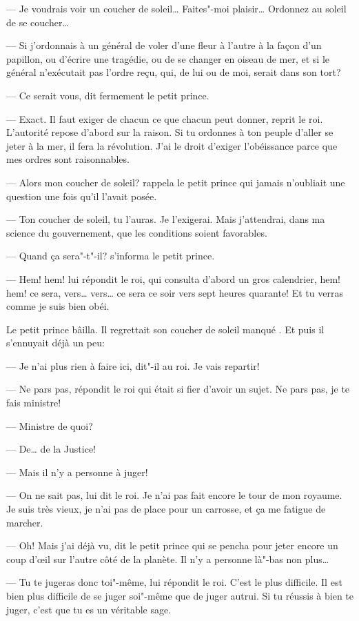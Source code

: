 \begin{Parallel}[p]{}{}
{--- Je voudrais voir un coucher de soleil\ldots{} Faites"-moi plaisir\ldots{} Ordonnez au soleil de se coucher\ldots{}

--- Si j'ordonnais à un général de voler d'une fleur à l'autre à la façon d'un papillon, ou d'écrire une tragédie, ou de se changer en oiseau de mer, et
si le général n'exécutait pas l'ordre reçu, qui, de lui
ou de moi, serait dans son tort?

--- Ce serait vous, dit fermement le petit prince.

--- Exact. Il faut exiger de chacun ce que chacun
peut donner, reprit le roi. L'autorité repose d'abord
sur la raison. Si tu ordonnes à ton peuple d'aller se
jeter à la mer, il fera la révolution. J'ai le droit d'exiger
l'obéissance parce que mes ordres sont raisonnables.

--- Alors mon coucher de soleil? rappela le petit
prince qui jamais n'oubliait une question une fois
qu'il l'avait posée.

--- Ton coucher de soleil, tu l'auras. Je l'exigerai.
Mais j'attendrai, dans ma science du gouvernement,
que les conditions soient favorables.

--- Quand ça sera"-t"-il? s'informa le petit prince.

--- Hem! hem! lui répondit le roi, qui consulta
d'abord un gros calendrier, hem! hem! ce sera,
vers\ldots{} vers\ldots{} ce sera ce soir vers sept heures quarante! Et tu verras comme je suis bien obéi.

Le petit prince bâilla. Il regrettait son coucher de
soleil manqué . Et puis il s'ennuyait déjà un peu:

--- Je n'ai plus rien à faire ici, dit"-il au roi. Je vais
repartir!

--- Ne pars pas, répondit le roi qui était si fier
d'avoir un sujet. Ne pars pas, je te fais ministre!

--- Ministre de quoi?

--- De\ldots{} de la Justice!

--- Mais il n'y a personne à juger!

--- On ne sait pas, lui dit le roi. Je n'ai pas fait
encore le tour de mon royaume. Je suis très vieux, je
n'ai pas de place pour un carrosse, et ça me fatigue
de marcher.

--- Oh! Mais j'ai déjà vu, dit le petit prince qui se
pencha pour jeter encore un coup d'œil sur l'autre
côté de la planète. Il n'y a personne là"-bas non
plus\ldots{}

--- Tu te jugeras donc toi"-même, lui répondit le
roi. C'est le plus difficile. Il est bien plus difficile de
se juger soi"-même que de juger autrui. Si tu réussis à
bien te juger, c'est que tu es un véritable sage.

}
\end{Parallel}
